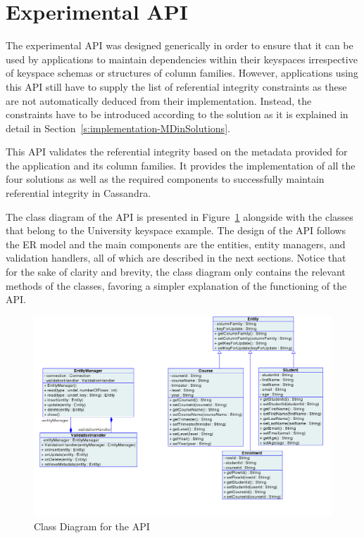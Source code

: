 \section{Experimental API}\label{s:implementation-API}

The experimental \ac{API} was designed generically in order to ensure that it
can be used by  applications to maintain dependencies within their keyspaces
irrespective of keyspace schemas or structures of column families.  However,
applications using this \ac{API} still have to supply  the list of referential
integrity constraints as these are not automatically deduced from their
implementation. Instead, the constraints have to be introduced according to the
solution as it is explained in detail in
Section~\ref{s:implementation-MDinSolutions}.


This \ac{API} validates the referential integrity based on the metadata provided
for the application and its column families.   It  provides the implementation of
all the four solutions as well as the required components to successfully
maintain referential integrity in Cassandra.

The  class diagram of the \ac{API} is presented  in
 Figure~\ref{f:classDiagram} alongside with the  classes that belong to 
the University keyspace example.  The design of the \ac{API} follows the
\ac{ER} model and the main components are the entities, entity managers,  and
validation handlers,  all of which are described in the next sections.
 Notice that for the sake of clarity and brevity,   the class diagram only
 contains  the relevant  methods of the classes,  favoring a simpler
explanation of the functioning of the \ac{API}. 

\begin{figure}[h]  
	\centering
	\includegraphics[width=\textwidth]{./figure/Solutions/FinalClassDiagram.png}
	\caption{Class Diagram for the \ac{API}}\label{f:classDiagram}
\end{figure}


